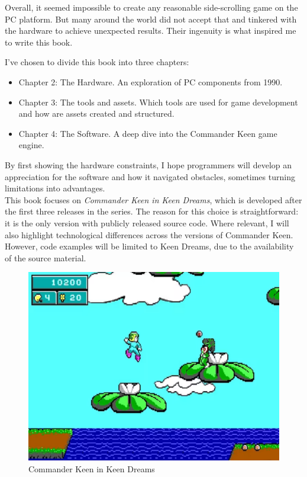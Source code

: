 \documentclass[book.tex]{subfiles}
\begin{document}


Overall, it seemed impossible to create any reasonable side-scrolling game on the PC platform. But many around the world did not accept that and tinkered with the hardware to achieve unexpected results. Their ingenuity is what inspired me to write this book. \\

\par
I've chosen to divide this book into three chapters:
\begin{itemize}
  \item Chapter 2: The Hardware. An exploration of PC components from 1990.
  \item Chapter 3: The tools and assets. Which tools are used for game development and how are assets created and structured.
  \item Chapter 4: The Software. A deep dive into the Commander Keen game engine.

\end{itemize}

\par
By first showing the hardware constraints, I hope programmers will develop an appreciation for the software and how it navigated obstacles, sometimes turning limitations into advantages.\\

\pagebreak
This book focuses on \textit{Commander Keen in Keen Dreams}, which is developed after the first three releases in the series. The reason for this choice is straightforward: it is the only version with publicly released source code. Where relevant, I will also highlight technological differences across the versions of Commander Keen. However, code examples will be limited to Keen Dreams, due to the availability of the source material.\\

\begin{figure}[H]
  \centering
 \includegraphics[width=1.0\textwidth]{screenshots_300dpi/Keen_Dreams.png}
\caption{Commander Keen in Keen Dreams}
\end{figure}
\end{document}
